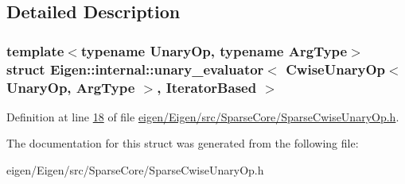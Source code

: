 \subsection{Detailed Description}
\subsubsection*{template$<$typename Unary\+Op, typename Arg\+Type$>$\newline
struct Eigen\+::internal\+::unary\+\_\+evaluator$<$ Cwise\+Unary\+Op$<$ Unary\+Op, Arg\+Type $>$, Iterator\+Based $>$}



Definition at line \hyperlink{eigen_2_eigen_2src_2_sparse_core_2_sparse_cwise_unary_op_8h_source_l00018}{18} of file \hyperlink{eigen_2_eigen_2src_2_sparse_core_2_sparse_cwise_unary_op_8h_source}{eigen/\+Eigen/src/\+Sparse\+Core/\+Sparse\+Cwise\+Unary\+Op.\+h}.



The documentation for this struct was generated from the following file\+:\begin{DoxyCompactItemize}
\item 
eigen/\+Eigen/src/\+Sparse\+Core/\+Sparse\+Cwise\+Unary\+Op.\+h\end{DoxyCompactItemize}
